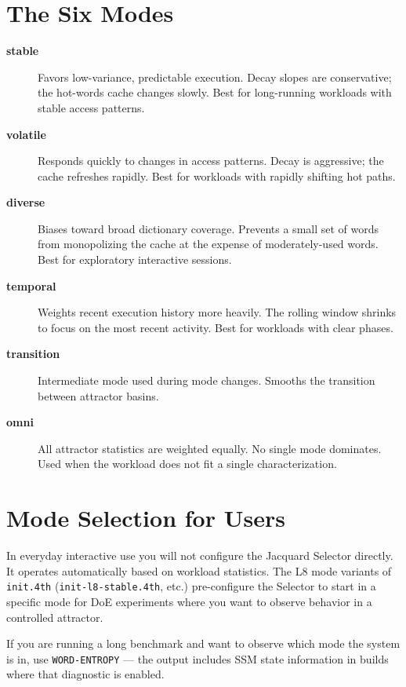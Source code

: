 \section{The Six Modes}
\label{sec:jacquard-modes}

\begin{description}
  \item[\textbf{stable}] Favors low-variance, predictable execution. Decay
    slopes are conservative; the hot-words cache changes slowly. Best for
    long-running workloads with stable access patterns.
  \item[\textbf{volatile}] Responds quickly to changes in access patterns.
    Decay is aggressive; the cache refreshes rapidly. Best for workloads
    with rapidly shifting hot paths.
  \item[\textbf{diverse}] Biases toward broad dictionary coverage. Prevents
    a small set of words from monopolizing the cache at the expense of
    moderately-used words. Best for exploratory interactive sessions.
  \item[\textbf{temporal}] Weights recent execution history more heavily.
    The rolling window shrinks to focus on the most recent activity. Best
    for workloads with clear phases.
  \item[\textbf{transition}] Intermediate mode used during mode changes.
    Smooths the transition between attractor basins.
  \item[\textbf{omni}] All attractor statistics are weighted equally. No
    single mode dominates. Used when the workload does not fit a single
    characterization.
\end{description}

\section{Mode Selection for Users}
\label{sec:jacquard-user}

In everyday interactive use you will not configure the Jacquard Selector
directly. It operates automatically based on workload statistics. The L8
mode variants of \texttt{init.4th} (\texttt{init-l8-stable.4th}, etc.)
pre-configure the Selector to start in a specific mode for DoE experiments
where you want to observe behavior in a controlled attractor.

If you are running a long benchmark and want to observe which mode the system
is in, use \texttt{WORD-ENTROPY} --- the output includes SSM state
information in builds where that diagnostic is enabled.

